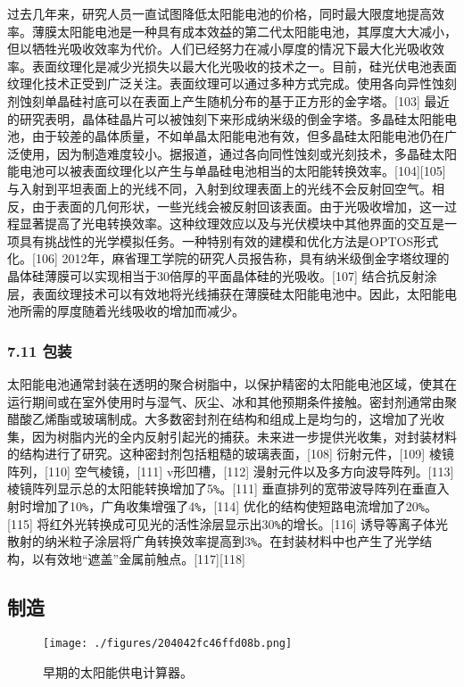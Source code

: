 过去几年来，研究人员一直试图降低太阳能电池的价格，同时最大限度地提高效率。薄膜太阳能电池是一种具有成本效益的第二代太阳能电池，其厚度大大减小，但以牺牲光吸收效率为代价。人们已经努力在减小厚度的情况下最大化光吸收效率。表面纹理化是减少光损失以最大化光吸收的技术之一。目前，硅光伏电池表面纹理化技术正受到广泛关注。表面纹理可以通过多种方式完成。使用各向异性蚀刻剂蚀刻单晶硅衬底可以在表面上产生随机分布的基于正方形的金字塔。[103] 最近的研究表明，晶体硅晶片可以被蚀刻下来形成纳米级的倒金字塔。多晶硅太阳能电池，由于较差的晶体质量，不如单晶太阳能电池有效，但多晶硅太阳能电池仍在广泛使用，因为制造难度较小。据报道，通过各向同性蚀刻或光刻技术，多晶硅太阳能电池可以被表面纹理化以产生与单晶硅电池相当的太阳能转换效率。[104][105] 与入射到平坦表面上的光线不同，入射到纹理表面上的光线不会反射回空气。相反，由于表面的几何形状，一些光线会被反射回该表面。由于光吸收增加，这一过程显著提高了光电转换效率。这种纹理效应以及与光伏模块中其他界面的交互是一项具有挑战性的光学模拟任务。一种特别有效的建模和优化方法是OPTOS形式化。[106] 2012年，麻省理工学院的研究人员报告称，具有纳米级倒金字塔纹理的晶体硅薄膜可以实现相当于30倍厚的平面晶体硅的光吸收。[107] 结合抗反射涂层，表面纹理技术可以有效地将光线捕获在薄膜硅太阳能电池中。因此，太阳能电池所需的厚度随着光线吸收的增加而减少。

\subsubsection{7.11 包装}

太阳能电池通常封装在透明的聚合树脂中，以保护精密的太阳能电池区域，使其在运行期间或在室外使用时与湿气、灰尘、冰和其他预期条件接触。密封剂通常由聚醋酸乙烯酯或玻璃制成。大多数密封剂在结构和组成上是均匀的，这增加了光收集，因为树脂内光的全内反射引起光的捕获。未来进一步提供光收集，对封装材料的结构进行了研究。这种密封剂包括粗糙的玻璃表面，[108] 衍射元件，[109] 棱镜阵列，[110] 空气棱镜，[111] v形凹槽，[112] 漫射元件以及多方向波导阵列。[113] 棱镜阵列显示总的太阳能转换增加了5\verb|%|。[111] 垂直排列的宽带波导阵列在垂直入射时增加了10\verb|%|，广角收集增强了4\verb|%|，[114] 优化的结构使短路电流增加了20\verb|%|。[115] 将红外光转换成可见光的活性涂层显示出30\verb|%|的增长。[116] 诱导等离子体光散射的纳米粒子涂层将广角转换效率提高到3\verb|%|。在封装材料中也产生了光学结构，以有效地“遮盖”金属前触点。[117][118]

\subsection{制造}

\begin{figure}[ht]
\centering
\texttt{[image: ./figures/204042fc46ffd08b.png]}
\caption{早期的太阳能供电计算器。} \label{fig_TYNDC_3}
\end{figure}

